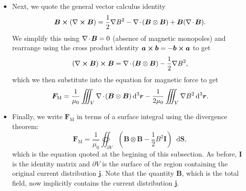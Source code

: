 \documentclass[11pt, a4paper]{article}
\newcommand{\diff}{\mathop{}\!\mathrm{d}} %
\newcommand{\dr}{\diff^{3} \r}  %
\renewcommand{\vec}[1]{\bm{#1}} %
\newcommand{\mat}[1]{\mathbf{#1}} %
\renewcommand{\r}{\vec{r}}
\newcommand{\B}{\vec{B}} %
\newcommand{\mm}{\mu_{0}}  %
\renewcommand{\j}{\vec{j}}  %
\renewcommand{\div}{\nabla \mspace{-2mu} \cdot \mspace{-2mu}}
\renewcommand{\curl}{\nabla \cross}
\renewcommand{\grad}{\nabla}
\begin{document}
\begin{itemize}
    \item Next, we quote the general vector calculus identity
	\begin{equation*}
		\B \cross (\curl \B) = \frac{1}{2}\grad B^{2} - \div (\B \otimes \B) + \B(\div \B).
	\end{equation*}
    We simplify this using $ \div \B = 0 $ (absence of magnetic monopoles) and rearrange using the cross product identity $ \vec{a} \cross \vec{b} = - \vec{b} \cross \vec{a} $ to get
    \begin{equation*}
        (\curl \B) \cross \B = \div (\B \otimes \B) - \frac{1}{2} \grad B^{2},
    \end{equation*}
    which we then substitute into the equation for magnetic force to get
	\begin{equation*}
		\vec{F}_{\text{M}} = \frac{1}{\mm}\iiint_{V} \div (\B \otimes \B)\dr - \frac{1}{2\mm}\iiint_{V} \grad B^{2}\dr.
	\end{equation*}
	
	\item Finally, we write $ \vec{F}_{\text{M}} $ in terms of a surface integral using the divergence theorem:
	\begin{equation*}
		\vec{F}_{\text{M}} = \frac{1}{\mm}\oiint_{\partial V}\left(\B \otimes \B - \frac{1}{2}B^{2}\mat{I}\right)\diff \vec{S},
	\end{equation*}
    which is the equation quoted at the begining of this subsection. As before, $ \mat{I} $ is the identity matrix and $ \partial V $ is the surface of the region containing the original current distribution $ \j $. Note that the quantity $ \B $, which is the total field, now implicitly contains the current distribution $ \j $.
\end{itemize}
\end{document}
